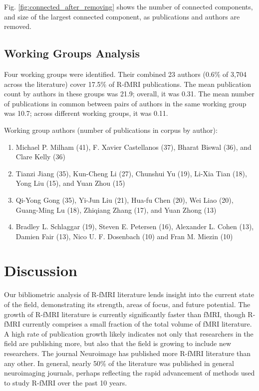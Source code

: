 \documentclass[5p]{elsarticle}
\begin{document}
Fig. \ref{fig:connected_after_removing} shows the number of connected components, and
size of the largest connected component, as publications and authors are
removed.  

\subsection{Working Groups Analysis}
Four working groups were identified. Their combined 23 authors (0.6\% of
3,704 across the literature) cover 17.5\% of R-fMRI publications. The mean
publication count by authors in these groups was 21.9; overall, it was
0.31. The mean number of publications in common between pairs of authors
in the same working group was 10.7; across different working groups, it
was 0.11.  

Working group authors (number of publications in corpus by author):
\begin{enumerate}
\item Michael P. Milham (41), F. Xavier Castellanos (37), Bharat Biswal
(36), and Clare Kelly (36)
\item Tianzi Jiang (35), Kun-Cheng Li (27), Chunshui Yu (19), Li-Xia Tian
(18), Yong Liu (15), and Yuan Zhou (15)
\item Qi-Yong Gong (35), Yi-Jun Liu (21), Hua-fu Chen (20), Wei Liao (20),
Guang-Ming Lu (18), Zhiqiang Zhang (17), and Yuan Zhong (13) 
\item Bradley L. Schlaggar (19), Steven E. Petersen (16), Alexander L.
Cohen (13), Damien Fair (13), Nico U. F. Dosenbach (10) and Fran M. Miezin
(10)
\end{enumerate}

\section{Discussion}

Our bibliometric analysis of R-fMRI literature lends insight into the
current state of the field, demonstrating its strength, areas of focus,
and future potential. The growth of R-fMRI literature is currently
significantly faster than fMRI, though R-fMRI currently comprises a small
fraction of the total volume of fMRI literature. A high rate of
publication growth likely indicates not only that researchers in the field
are publishing more, but also that the field is growing to include new
researchers.  The journal Neuroimage has published more R-fMRI literature
than any other. In general, nearly 50\% of the literature was published in
general neuroimaging journals, perhaps reflecting the rapid advancement of
methods used to study R-fMRI over the past 10 years. 
\end{document}

